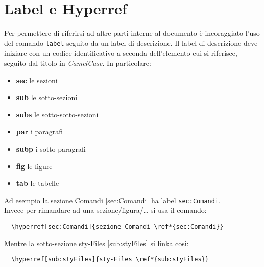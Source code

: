 \documentclass[a4paper,titlepage]{article}
\begin{document}
\section{Label e Hyperref}
\label{sec:LabelHyperref}

Per permettere di riferirsi ad altre parti interne al documento è incoraggiato l'uso del comando \texttt{label} seguito da un label di descrizione.
Il label di descrizione deve iniziare con un codice identificativo a seconda dell'elemento cui si riferisce, seguito dal titolo in \textit{CamelCase}. In particolare:

\begin{itemize}
  \item \textbf{sec} le sezioni
  \item \textbf{sub} le sotto-sezioni
  \item \textbf{subs} le sotto-sotto-sezioni
  \item \textbf{par} i paragrafi
  \item \textbf{subp} i sotto-paragrafi
  \item \textbf{fig} le figure
  \item \textbf{tab} le tabelle
\end{itemize}

Ad esempio la \hyperref[sec:Comandi]{sezione Comandi \ref*{sec:Comandi}} ha label \texttt{sec:Comandi}. \\
Invece per rimandare ad una sezione/figura/… si usa il comando:
\begin{lstlisting}
  \hyperref[sec:Comandi]{sezione Comandi \ref*{sec:Comandi}}
\end{lstlisting}
Mentre la sotto-sezione \hyperref[sub:styFiles]{sty-Files \ref*{sub:styFiles}} si linka così:
\begin{lstlisting}
  \hyperref[sub:styFiles]{sty-Files \ref*{sub:styFiles}}
\end{lstlisting}
\end{document}
